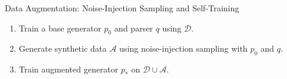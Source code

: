 \begin{frame}{Data Augmentation: Noise-Injection Sampling and Self-Training}
\begin{enumerate}
    \item Train a base generator $p_0$ and parser $q$ using $\mathcal{D}$.
    \vspace{10pt}
    \item Generate synthetic data $\mathcal{A}$ using noise-injection sampling with $p_0$ and $q$.
    \vspace{10pt}
    \item Train augmented generator $p_*$ on $\mathcal{D}\cup\mathcal{A}$.
\end{enumerate}

\end{frame}




